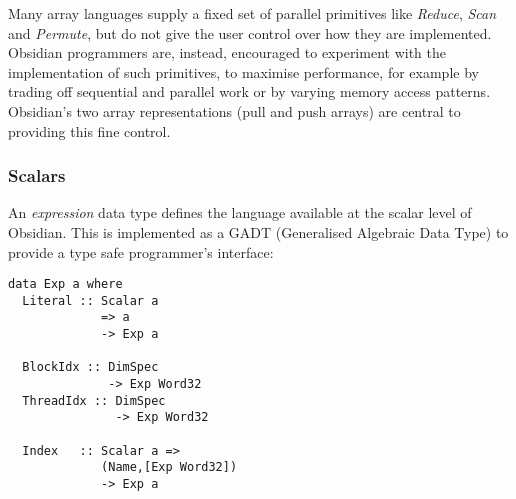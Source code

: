 

Many array languages supply a fixed set
of parallel primitives like {\em Reduce}, {\em Scan} and {\em Permute}, but
do not give the user control over how they are implemented.
Obsidian programmers are, instead, encouraged to experiment with the
implementation of such primitives, to maximise performance, for example
by trading off sequential and parallel work or by varying memory access patterns.
Obsidian's two array representations (pull and push arrays) are central to providing 
this fine control.

\subsubsection{Scalars}

An {\em expression} data type defines the language
available at the scalar level of Obsidian. This is implemented as a GADT (Generalised Algebraic Data Type) to provide a type safe 
programmer's interface: 

\begin{small} 
\begin{Verbatim}[samepage=false]
data Exp a where
  Literal :: Scalar a 
             => a 
             -> Exp a 

  BlockIdx :: DimSpec 
              -> Exp Word32 
  ThreadIdx :: DimSpec
               -> Exp Word32
    
  Index   :: Scalar a => 
             (Name,[Exp Word32]) 
             -> Exp a 
\end{Verbatim}
\end{small}

\pagebreak

